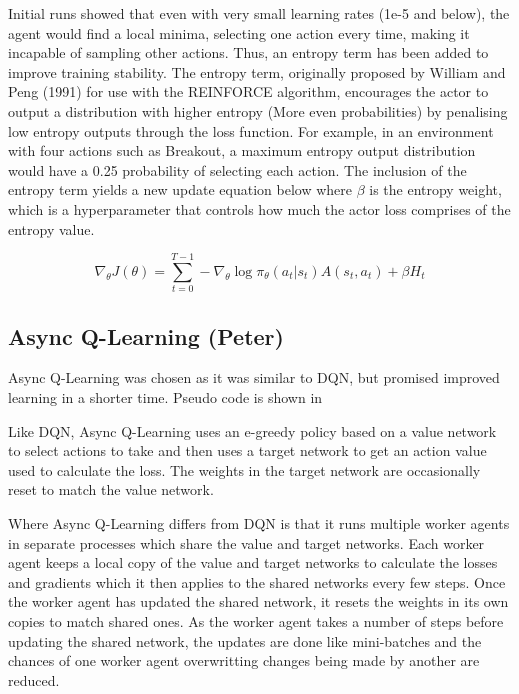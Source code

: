 \documentclass{article}
\begin{document}
Initial runs showed that even with very small learning rates (1e-5 and below), the agent would find a local minima, selecting one action every time, making it incapable of sampling other actions. Thus, an entropy term has been added to improve training stability. The entropy term, originally proposed by William and Peng (1991) for use with the REINFORCE algorithm, encourages the actor to output a distribution with higher entropy (More even probabilities) by penalising low entropy outputs through the loss function. For example, in an environment with four actions such as Breakout, a maximum entropy output distribution would have a 0.25 probability of selecting each action. The inclusion of the entropy term yields a new update equation below where  $\beta$ is the entropy weight, which is a hyperparameter that controls how much the actor loss comprises of the entropy value.

\begin{equation}
\nabla_{\theta} J(\theta) = \sum_{t=0}^{T-1}-\nabla_{\theta}\log{\pi_{\theta}}(a_{t} | s_{t}) A(s_{t}, a_{t}) + \beta H_{t}
\end{equation}

\subsection{Async Q-Learning (Peter)}

Async Q-Learning was chosen as it was similar to DQN, but promised improved learning in a shorter time.
Pseudo code is shown in 

Like DQN, Async Q-Learning uses an e-greedy policy based on a value network to select actions to take and then uses a target network to get an action value used to calculate the loss.
The weights in the target network are occasionally reset to match the value network.

Where Async Q-Learning differs from DQN is that it runs multiple worker agents in separate processes which share the value and target networks.
Each worker agent keeps a local copy of the value and target networks to calculate the losses and gradients which it then applies to the shared networks every few steps.
Once the worker agent has updated the shared network, it resets the weights in its own copies to match shared ones.
As the worker agent takes a number of steps before updating the shared network, the updates are done like mini-batches and the chances of one worker agent overwritting changes being made by another are reduced.
\end{document}
